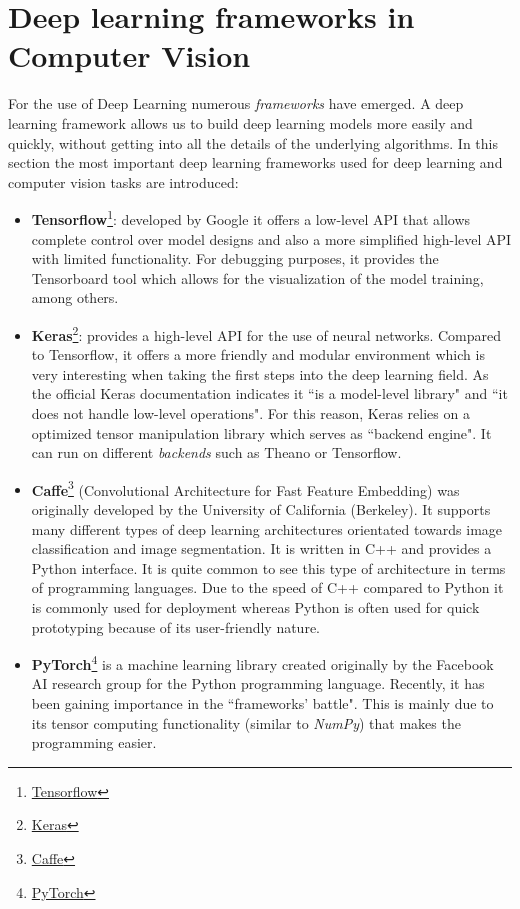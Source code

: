 \section{Deep learning frameworks in Computer Vision}
For the use of Deep Learning numerous \textit{frameworks} have emerged. A deep learning framework allows us to build deep learning models more easily and quickly, without getting into all the details of the underlying algorithms. In this section the most important deep learning frameworks used for deep learning and computer vision tasks are introduced:
\begin{itemize}
\item \textbf{Tensorflow}\footnote {\href{https://www.tensorflow.org/}{Tensorflow}}: developed by Google it offers a low-level API that allows complete control over model designs and also a more simplified high-level API with limited functionality. For debugging purposes, it provides the Tensorboard tool which allows for the visualization of the model training, among others.
\item \textbf{Keras}\footnote {\href{https://keras.io/}{Keras}}: provides a high-level API for the use of neural networks. Compared to Tensorflow, it offers a more friendly and modular environment which is very interesting when taking the first steps into the deep learning field. As the official Keras documentation indicates it ``is a model-level library" and ``it does not handle low-level operations". For this reason, Keras relies on a optimized tensor manipulation library which serves as ``backend engine". It can run on different \textit{backends} such as Theano or Tensorflow.
\item \textbf{Caffe}\footnote {\href{https://caffe.berkeleyvision.org/}{Caffe}} (Convolutional Architecture for Fast Feature Embedding) was originally developed by the University of California (Berkeley). It supports many different types of deep learning architectures orientated towards image classification and image segmentation. It is written in C++ and provides a Python interface. It is quite common to see this type of architecture in terms of programming languages. Due to the speed of C++ compared to Python it is commonly used for deployment whereas Python is often used for quick prototyping because of its user-friendly nature.
\item \textbf{PyTorch}\footnote {\href{https://pytorch.org/}{PyTorch}} is a machine learning library created originally by the Facebook AI research group for the Python programming language. Recently, it has been gaining importance in the ``frameworks' battle". This is mainly due to its tensor computing functionality (similar to \textit{NumPy}) that makes the programming easier.
\end{itemize}

